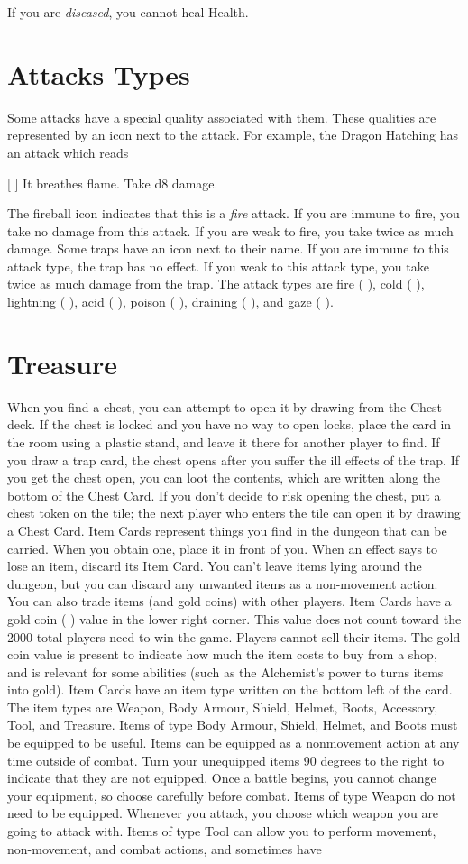 \documentclass{book}
\begin{document}
If you are \emph{diseased}, you cannot heal Health.

\section{Attacks Types}
Some attacks have a special quality associated with them. These qualities are represented by an icon next to the attack. For example, the Dragon Hatching has an attack which reads

[ ] It breathes flame. Take d8 damage.

The fireball icon indicates that this is a \emph{fire} attack. If you are immune to fire, you take no damage from this attack.  If you are weak to fire, you take twice as much damage. Some traps have an icon next to their name. If you are immune to this attack type, the trap has no effect. If you weak to this attack type, you take twice as much damage from the trap.
The attack types are fire ( ), cold ( ), lightning ( ), acid ( ), poison ( ), draining ( ), and gaze ( ).

\section{Treasure}
When you find a chest, you can attempt to open it by drawing from the Chest deck. If the chest is locked and you
have no way to open locks, place the card in the room using a plastic stand, and leave it there for another player
to find. If you draw a trap card, the chest opens after you suffer the ill effects of the trap. If you get the chest
open, you can loot the contents, which are written along the bottom of the Chest Card. If you don’t decide to risk
opening the chest, put a chest token on the tile; the next player who enters the tile can open it by drawing a Chest
Card.
Item Cards represent things you find in the dungeon that can be carried. When you obtain one, place it in front of
you. When an effect says to lose an item, discard its Item Card. You can’t leave items lying around the dungeon,
but you can discard any unwanted items as a non-movement action. You can also trade items (and gold coins)
with other players.
Item Cards have a gold coin ( ) value in the lower right corner. This value does not count toward the 2000 total
players need to win the game. Players cannot sell their items. The gold coin value is present to indicate how much
the item costs to buy from a shop, and is relevant for some abilities (such as the Alchemist’s power to turns items
into gold).
Item Cards have an item type written on the bottom left of the card. The item types are Weapon, Body Armour, Shield,
Helmet, Boots, Accessory, Tool, and Treasure.
Items of type Body Armour, Shield, Helmet, and Boots must be equipped to be useful. Items can be equipped as a nonmovement action at any time outside of combat. Turn your unequipped items 90 degrees to the right to indicate
that they are not equipped. Once a battle begins, you cannot change your equipment, so choose carefully before
combat.
Items of type Weapon do not need to be equipped. Whenever you attack, you choose which weapon you are
going to attack with.
Items of type Tool can allow you to perform movement, non-movement, and combat actions, and sometimes have
\end{document}
